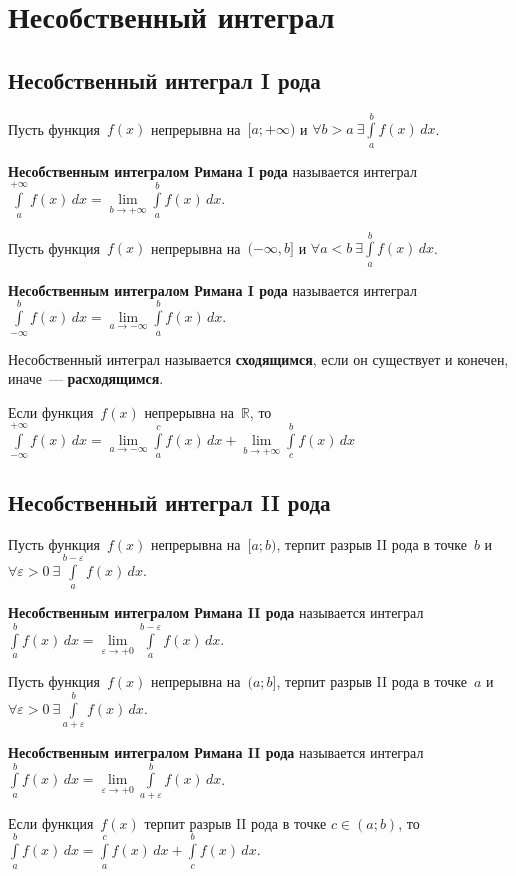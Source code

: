 \section{Несобственный интеграл}

\subsection{Несобственный интеграл I рода}
Пусть функция~$f(x)$ непрерывна на~$[a; +\infty)$ и $\forall b > a \ \exists \int\limits_a^b f(x)\,dx$.

\textbf{Несобственным интегралом Римана I рода} называется интеграл $\int\limits_a^{+\infty} f(x)\,dx = \lim\limits_{b \to +\infty} \int\limits_a^b f(x)\,dx$.

Пусть функция~$f(x)$ непрерывна на~$(-\infty, b]$ и $\forall a < b \ \exists \int\limits_a^b f(x)\,dx$.

\textbf{Несобственным интегралом Римана I рода} называется интеграл $\int\limits_{-\infty}^b f(x)\,dx = \lim\limits_{a \to -\infty} \int\limits_a^b f(x)\,dx$.

Несобственный интеграл называется \textbf{сходящимся}, если он существует и конечен, иначе~--- \textbf{расходящимся}.

Если функция~$f(x)$ непрерывна на~$\mathbb R$, то
$\int\limits_{-\infty}^{+\infty} f(x)\,dx =
\lim\limits_{a \to -\infty} \int\limits_a^c f(x)\,dx + \lim\limits_{b \to +\infty} \int\limits_c^b f(x)\,dx$

\subsection{Несобственный интеграл II рода}
Пусть функция~$f(x)$ непрерывна на~$[a; b)$, терпит разрыв II рода в точке~$b$ и $\forall \varepsilon > 0 \ \exists \int\limits_a^{b-\varepsilon} f(x)\,dx$.

\textbf{Несобственным интегралом Римана II рода} называется интеграл $\int\limits_a^b f(x)\,dx = \lim\limits_{\varepsilon \to +0} \int\limits_a^{b-\varepsilon} f(x)\,dx$.

Пусть функция~$f(x)$ непрерывна на~$(a; b]$, терпит разрыв II рода в точке~$a$ и $\forall \varepsilon > 0 \ \exists \int\limits_{a+\varepsilon}^b f(x)\,dx$.

\textbf{Несобственным интегралом Римана II рода} называется интеграл $\int\limits_a^b f(x)\,dx = \lim\limits_{\varepsilon \to +0} \int\limits_{a+\varepsilon}^b f(x)\,dx$.

Если функция~$f(x)$ терпит разрыв II рода в точке $c \in (a; b)$, то $\int\limits_a^b f(x)\,dx = \int\limits_a^c f(x)\,dx + \int\limits_c^b f(x)\,dx$.